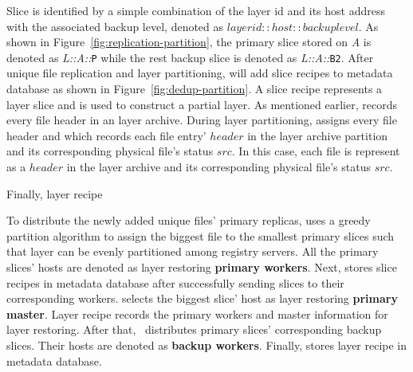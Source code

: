 Slice is identified by a simple combination of the layer id and its host address 
with the associated backup level,
denoted as $layerid::host::backuplevel$. %
As shown in Figure~\ref{fig:replication-partition},
the primary slice stored on \emph{A} is denoted as \emph{L::}\emph{A::}\texttt{P}
while the rest backup slice is denoted as \emph{L::}\emph{A::}\texttt{B2}.
After unique file replication and layer partitioning, 
\sysname will add slice recipes 
to metadata database as shown in Figure~\ref{fig:dedup-partition}.
A slice recipe represents a layer slice and
is used to construct a partial layer.
% 
%
As mentioned earlier, 
\sysname records every file header in an layer archive.
During layer partitioning,
%
\sysname
assigns every file header and
which
records each file entry' $header$ in the layer archive partition and 
its corresponding physical file's status $src$. 
In this case, 
each file is represent as a $header$ in the layer archive and
its corresponding physical file's status $src$. 



Finally, layer recipe 


To distribute the newly added unique files' primary replicas,
\sysname uses a greedy partition algorithm to 
assign the biggest file to the smallest primary slices
such that layer can be evenly partitioned among registry servers.
All the primary slices' hosts are denoted as layer restoring \textbf{primary workers}. 
Next, \sysname stores slice recipes in metadata database after successfully
sending slices to their corresponding workers.
\sysname selects the biggest slice' host as layer restoring \textbf{primary master}.
Layer recipe records the primary workers and master information for layer restoring.
After that, \sysname~distributes primary slices' corresponding backup slices.
Their hosts are denoted as \textbf{backup workers}.
Finally, \sysname stores layer recipe in metadata database.

